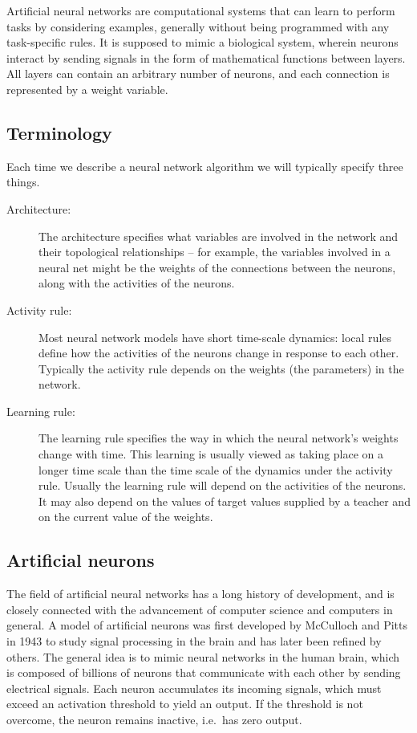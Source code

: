 \documentclass[%
oneside,                 %
final,                   %
10pt]{article}
\begin{document}
Artificial neural networks are computational systems that can learn to
perform tasks by considering examples, generally without being
programmed with any task-specific rules. It is supposed to mimic a
biological system, wherein neurons interact by sending signals in the
form of mathematical functions between layers. All layers can contain
an arbitrary number of neurons, and each connection is represented by
a weight variable.

\subsection{Terminology}

Each time we describe a neural network algorithm we will typically specify three things. 

\begin{description}
\item[Architecture:] 
  The architecture specifies what variables are involved in the network and their topological relationships – for example, the variables involved in a neural net might be the weights of the connections between the neurons, along with the activities of the neurons.

\item[Activity rule:] 
  Most neural network models have short time-scale dynamics: local rules define how the activities of the neurons change in response to each other. Typically the activity rule depends on the weights (the parameters) in the network.

\item[Learning rule:] 
  The learning rule specifies the way in which the neural network’s weights change with time. This learning is usually viewed as taking place on a longer time scale than the time scale of the dynamics under the activity rule. Usually the learning rule will depend on the activities of the neurons. It may also depend on the values of target values supplied by a teacher and on the current value of the weights.
\end{description}

\noindent
\subsection{Artificial neurons}

The field of artificial neural networks has a long history of
development, and is closely connected with the advancement of computer
science and computers in general. A model of artificial neurons was
first developed by McCulloch and Pitts in 1943 to study signal
processing in the brain and has later been refined by others. The
general idea is to mimic neural networks in the human brain, which is
composed of billions of neurons that communicate with each other by
sending electrical signals.  Each neuron accumulates its incoming
signals, which must exceed an activation threshold to yield an
output. If the threshold is not overcome, the neuron remains inactive,
i.e.~has zero output.
\end{document}
